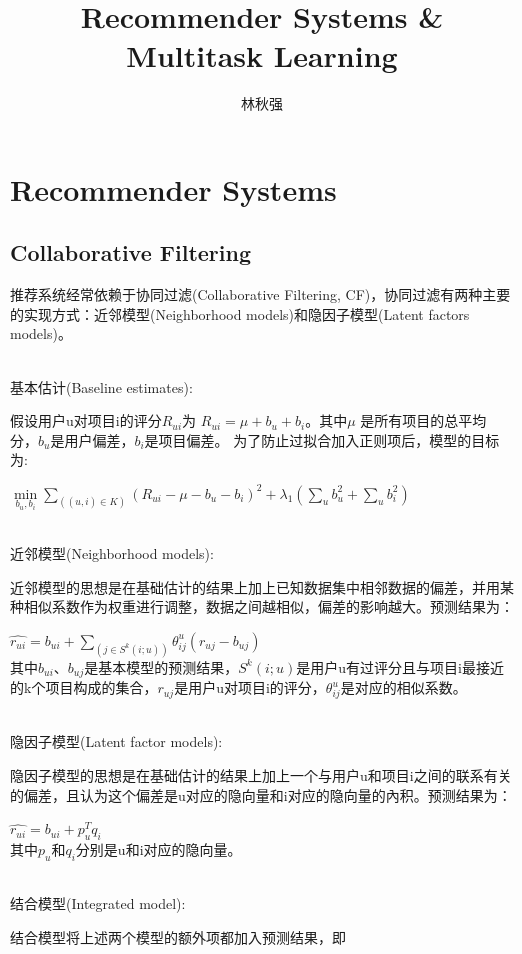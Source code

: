 \documentclass[]{article}
\title{Recommender Systems \& Multitask Learning}
\author{林秋强}
\date{}
\begin{document}
\maketitle

\section{Recommender Systems}
\subsection{Collaborative Filtering}
推荐系统经常依赖于协同过滤(Collaborative Filtering, CF)\cite{Koren2008}，协同过滤有两种主要的实现方式：近邻模型(Neighborhood models)和隐因子模型(Latent factors models)。

~\\
基本估计(Baseline estimates):

假设用户u对项目i的评分$R_{ui}$为
$R_{ui} = \mu + b_{u} + b_{i}$。其中$\mu$ 是所有项目的总平均分，$b_{u}$是用户偏差，$b_{i}$是项目偏差。
为了防止过拟合加入正则项后，模型的目标为:

$\mathop {\min }\limits_{b_u,b_i} \sum_{((u,i)\in K)} (R_{ui} - \mu - b_{u} - b_{i})^2+\lambda_1 (\sum_{u}b_u^2+\sum_{u}b_i^2)$

~\\
近邻模型(Neighborhood models):

近邻模型的思想是在基础估计的结果上加上已知数据集中相邻数据的偏差，并用某种相似系数作为权重进行调整，数据之间越相似，偏差的影响越大。预测结果为：

$\hat{r_{ui}}=b_{ui}+\sum_{(j\in S^k(i;u))}\theta_{ij}^u(r_{uj}-b_{uj})$
~\\
其中$b_{ui}$、$b_{uj}$是基本模型的预测结果，$S^k(i;u)$是用户u有过评分且与项目i最接近的k个项目构成的集合，$r_{uj}$是用户u对项目i的评分，$\theta_{ij}^u$是对应的相似系数。

~\\
隐因子模型(Latent factor models):

隐因子模型的思想是在基础估计的结果上加上一个与用户u和项目i之间的联系有关的偏差，且认为这个偏差是u对应的隐向量和i对应的隐向量的內积。预测结果为：

$\hat{r_{ui}}=b_{ui}+p_u^Tq_i$
~\\
其中$p_u$和$q_i$分别是u和i对应的隐向量。

~\\
结合模型(Integrated model):

结合模型将上述两个模型的额外项都加入预测结果，即
\end{document}
